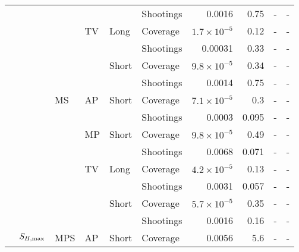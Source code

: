 \documentclass[article]{standalone}
\begin{document}
\begin{tabular}{llllllrrrr}
             &                   &    &    &       & Shootings &               0.0016 &      0.75 &                    - &                     - \\
             &                   &    & TV & Long & Coverage & $1.7 \times 10^{-5}$ &      0.12 &                    - &                     - \\
             &                   &    &    &       & Shootings &              0.00031 &      0.33 &                    - &                     - \\
             &                   &    &    & Short & Coverage & $9.8 \times 10^{-5}$ &      0.34 &                    - &                     - \\
             &                   &    &    &       & Shootings &               0.0014 &      0.75 &                    - &                     - \\
             &                   & MS & AP & Short & Coverage & $7.1 \times 10^{-5}$ &       0.3 &                    - &                     - \\
             &                   &    &    &       & Shootings &               0.0003 &     0.095 &                    - &                     - \\
             &                   &    & MP & Short & Coverage & $9.8 \times 10^{-5}$ &      0.49 &                    - &                     - \\
             &                   &    &    &       & Shootings &               0.0068 &     0.071 &                    - &                     - \\
             &                   &    & TV & Long & Coverage & $4.2 \times 10^{-5}$ &      0.13 &                    - &                     - \\
             &                   &    &    &       & Shootings &               0.0031 &     0.057 &                    - &                     - \\
             &                   &    &    & Short & Coverage & $5.7 \times 10^{-5}$ &      0.35 &                    - &                     - \\
             &                   &    &    &       & Shootings &               0.0016 &      0.16 &                    - &                     - \\
             & $S_{H, \rm{max}}$ & MPS & AP & Short & Coverage &               0.0056 &       5.6 &                    - &                     - \\

\end{tabular}
\end{document}
